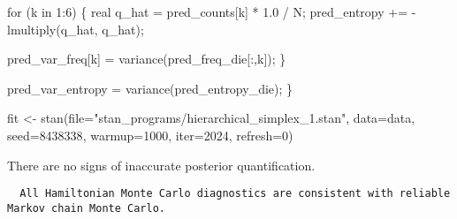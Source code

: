 \documentclass[
  letterpaper,
  DIV=11,
  numbers=noendperiod]{scrartcl}
\newenvironment{Shaded}{\begin{snugshade}}{\end{snugshade}}
\newcommand{\AttributeTok}[1]{\textcolor[rgb]{0.40,0.45,0.13}{#1}}
\newcommand{\ControlFlowTok}[1]{\textcolor[rgb]{0.00,0.23,0.31}{#1}}
\newcommand{\DataTypeTok}[1]{\textcolor[rgb]{0.68,0.00,0.00}{#1}}
\newcommand{\DecValTok}[1]{\textcolor[rgb]{0.68,0.00,0.00}{#1}}
\newcommand{\FloatTok}[1]{\textcolor[rgb]{0.68,0.00,0.00}{#1}}
\newcommand{\FunctionTok}[1]{\textcolor[rgb]{0.28,0.35,0.67}{#1}}
\newcommand{\NormalTok}[1]{\textcolor[rgb]{0.00,0.23,0.31}{#1}}
\newcommand{\OtherTok}[1]{\textcolor[rgb]{0.00,0.23,0.31}{#1}}
\newcommand{\SpecialCharTok}[1]{\textcolor[rgb]{0.37,0.37,0.37}{#1}}
\newcommand{\StringTok}[1]{\textcolor[rgb]{0.13,0.47,0.30}{#1}}
\begin{document}
\begin{codelisting}
\begin{Shaded}
\begin{Highlighting}[]
  \ControlFlowTok{for}\NormalTok{ (k }\ControlFlowTok{in} \DecValTok{1}\NormalTok{:}\DecValTok{6}\NormalTok{) \{}
    \DataTypeTok{real}\NormalTok{ q\_hat = pred\_counts[k] * }\FloatTok{1.0}\NormalTok{ / N;}
\NormalTok{    pred\_entropy += {-} lmultiply(q\_hat, q\_hat);}

\NormalTok{    pred\_var\_freq[k] = variance(pred\_freq\_die[:,k]);}
\NormalTok{  \}}

\NormalTok{  pred\_var\_entropy = variance(pred\_entropy\_die);}
\NormalTok{\}}
\end{Highlighting}
\end{Shaded}

\end{codelisting}

\begin{Shaded}
\begin{Highlighting}[]
\NormalTok{fit }\OtherTok{\textless{}{-}} \FunctionTok{stan}\NormalTok{(}\AttributeTok{file=}\StringTok{"stan\_programs/hierarchical\_simplex\_1.stan"}\NormalTok{,}
            \AttributeTok{data=}\NormalTok{data, }\AttributeTok{seed=}\DecValTok{8438338}\NormalTok{,}
            \AttributeTok{warmup=}\DecValTok{1000}\NormalTok{, }\AttributeTok{iter=}\DecValTok{2024}\NormalTok{, }\AttributeTok{refresh=}\DecValTok{0}\NormalTok{)}
\end{Highlighting}
\end{Shaded}

There are no signs of inaccurate posterior quantification.

\begin{Shaded}
\end{Shaded}

\begin{verbatim}
  All Hamiltonian Monte Carlo diagnostics are consistent with reliable
Markov chain Monte Carlo.
\end{verbatim}
\end{document}
